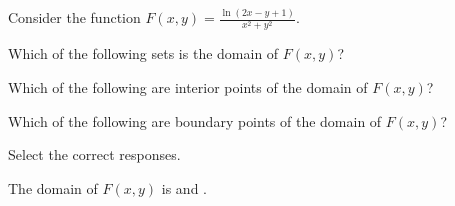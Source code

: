\documentclass{ximera}
\author{Jim Talamo}
\begin{document}
\begin{exercise}
  Consider the function $F(x,y) = \frac{\ln(2x-y+1)}{x^2+y^2}$.
  
  Which of the following sets is the domain of $F(x,y)$?
  \begin{multipleChoice}
  \choice{$\R$}
  \end{multipleChoice}
 
 Which of the following are interior points of the domain of $F(x,y)$?
 \begin{selectAll}
 \end{selectAll} 

 Which of the following are boundary points of the domain of $F(x,y)$?
 \begin{selectAll}
 \end{selectAll} 

Select the correct responses.

The domain of $F(x,y)$ is  and .
  \end{exercise}
\end{document}
